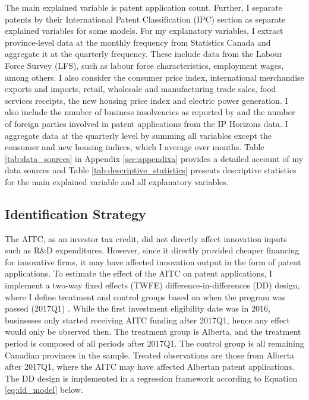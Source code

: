 \documentclass[../main.tex]{subfiles}
\begin{document}
The main explained variable is patent application count. Further, I separate patents by their International Patent Classification (IPC) section as separate explained variables for some models. For my explanatory variables, I extract province-level data at the monthly frequency from Statistics Canada and aggregate it at the quarterly frequency. These include data from the Labour Force Survey (LFS), such as labour force characteristics, employment wages, among others. I also consider the consumer price index, international merchandise exports and imports, retail, wholesale and manufacturing trade sales, food services receipts, the new housing price index and electric power generation. I also include the number of business insolvencies as reported by \textcite{insolvency24} and the number of foreign parties involved in patent applications from the IP Horizons data. I aggregate data at the quarterly level by summing all variables except the consumer and new housing indices, which I average over months. Table \ref{tab:data_sources} in Appendix \ref{sec:appendixa} provides a detailed account of my data sources and Table \ref{tab:descriptive_statistics} presents descriptive statistics for the main explained variable and all explanatory variables.

\subsection{Identification Strategy}
The AITC, as an investor tax credit, did not directly affect innovation inputs such as R\&D expenditures. However, since it directly provided cheaper financing for innovative firms, it may have affected innovation output in the form of patent applications. To estimate the effect of the AITC on patent applications, I implement a two-way fixed effects (TWFE) difference-in-differences (DD) design, where I define treatment and control groups based on when the program was passed (2017Q1) \parencite{albertaeconomicdevelopmentandtrade17}. While the first investment eligibility date was in 2016, businesses only started receiving AITC funding after 2017Q1, hence any effect would only be observed then. The treatment group is Alberta, and the treatment period is composed of all periods after 2017Q1. The control group is all remaining Canadian provinces in the sample. Treated observations are those from Alberta after 2017Q1, where the AITC may have affected Albertan patent applications. The DD design is implemented in a regression framework according to Equation \ref{eq:dd_model} below.
\end{document}
